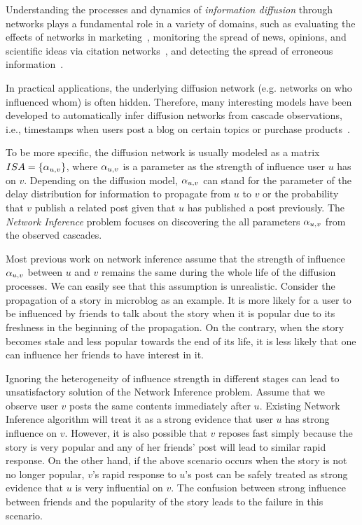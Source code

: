 Understanding the processes and dynamics of \emph{information diffusion} through networks plays a fundamental role in a variety of domains, such as evaluating the effects of networks in marketing~\cite{domingos:2001,kempe:2003,leskovec:2007a}, monitoring the spread of news, opinions, and scientific ideas via citation networks~\cite{adar:2004,gruhl:2004,leskovec:2005}, and detecting the spread of erroneous information~\cite{dong:2009}.

In practical applications, the underlying diffusion network (e.g. networks on who influenced whom) is often hidden. Therefore, many interesting models have been developed to automatically infer diffusion networks from cascade observations, i.e., timestamps when users post a blog on certain topics or purchase products~\cite{gomez-rodriguez:leskovec:krause:inferring,gomez-rodriguez:balduzzi:schoelkopf:uncovering,yang:zha:mutualExciting,zhou:zha:song:mutualExciting,Wang:Hu:Philip:Li:multiAspect,Daneshmand:Gomez:Song:recovery14,Du:Song:Song:Alex:HeterogeneousInf,Du:Song:Woo:Zha:topicCascade}. 


To be more specific, the diffusion network is usually modeled as a matrix $ISA=\{\alpha_{u,v}\}$, where $\alpha_{u,v}$ is a parameter as the strength of influence user $u$ has on $v$. Depending on the diffusion model, $\alpha_{u,v}$ can stand for the parameter of the delay distribution for information to propagate from $u$ to $v$ or the probability that $v$ publish a related post given that $u$ has published a post previously. The \emph{Network Inference} problem focuses on discovering the all parameters $\alpha_{u,v}$ from the observed cascades. 



Most previous work on network inference assume that the strength of influence $\alpha_{u,v}$ between $u$ and $v$ remains the same during the whole life of the diffusion processes. We can easily see that this assumption is unrealistic. Consider the propagation of a story in microblog as an example. It is more likely for a user to be influenced by friends to talk about the story when it is popular due to its freshness in the beginning of the propagation. On the contrary, when the story becomes stale and less popular towards the end of its life, it is less likely that one can influence her friends to have interest in it. 


Ignoring the heterogeneity of influence strength in different stages can lead to unsatisfactory solution of the Network Inference problem. Assume that we observe user $v$ posts the same contents immediately after $u$. Existing Network Inference algorithm will treat it as a strong evidence that user $u$ has strong influence on $v$. However, it is also possible that $v$ reposes fast simply because the story is very popular and any of her friends' post will lead to similar rapid response. On the other hand, if the above scenario occurs when the story is not no longer popular, $v$'s rapid response to $u$'s post can be safely treated as strong evidence that $u$ is very influential on $v$. The confusion between strong influence between friends and the popularity of the story leads to the failure in this scenario.  


